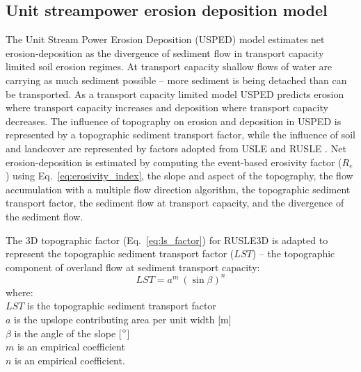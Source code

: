 \documentclass[gmd, manuscript]{copernicus}
\begin{document}
\subsection{Unit streampower erosion deposition model} \label{usped_model}
The Unit Stream Power Erosion Deposition (USPED) model 
estimates net erosion-deposition as the divergence of sediment flow
in transport capacity limited soil erosion regimes.
At transport capacity 
shallow flows of water are carrying as much sediment possible 
-- more sediment is being detached 
than can be transported.
As a transport capacity limited model
USPED predicts erosion where transport capacity increases
and deposition where transport capacity decreases. 
The influence of topography on erosion and deposition in USPED 
is represented by a topographic sediment transport factor,
while the influence of soil and landcover are represented by 
factors adopted from USLE and RUSLE
\citep{Mitasova1996}.
%
Net erosion-deposition is estimated by computing
the event-based erosivity factor ($R_e$) 
using Eq.~\ref{eq:erosivity_index},
the slope and aspect of the topography,
the flow accumulation with a multiple flow direction algorithm,
the topographic sediment transport factor,
the sediment flow at transport capacity,
and the divergence of the sediment flow. 

The 3D topographic factor (Eq.~\ref{eq:ls_factor}) 
for RUSLE3D is adapted to represent 
the topographic sediment transport factor ($LST$) --
the topographic component 
of overland flow at sediment transport capacity:
%
\begin{equation}
\label{eq:lst_factor}
{LST = a^{m} ~ (\sin \beta)^{n}}
\end{equation}
%
{\small
\noindent
where: \\
\noindent
\hspace*{0.5em} $LST$ is the topographic sediment transport factor\\
\hspace*{0.5em} $a$ is the upslope contributing area per unit width [m]\\
\hspace*{0.5em} $\beta$ is the angle of the slope [$^{\circ}$]\\
\hspace*{0.5em} $m$ is an empirical coefficient\\
\hspace*{0.5em} $n$ is an empirical coefficient.\\
}
\end{document}
